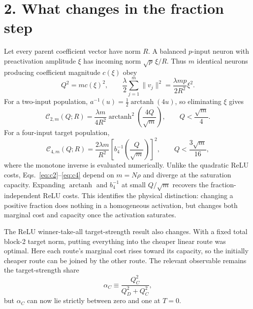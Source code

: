 \documentclass[10pt]{article}
\begin{document}
\section*{2. What changes in the fraction step}
Let every parent coefficient vector have norm $R$.  A balanced $p$-input neuron with
preactivation amplitude $\xi$ has incoming norm $\sqrt p\,\xi/R$.  Thus $m$ identical
neurons producing coefficient magnitude $c(\xi)$ obey
\begin{equation}
Q^2=m c(\xi)^2,\qquad
\frac{\lambda}{2}\sum_{j=1}^{m}\|v_j\|^2
=\frac{\lambda mp}{2R^2}\xi^2.
\label{eq:population}
\end{equation}
For a two-input population, $a^{-1}(u)=\tfrac12\operatorname{arctanh}(4u)$, so eliminating
$\xi$ gives
\begin{equation}
\boxed{\mathcal C_{2,m}(Q;R)=
\frac{\lambda m}{4R^2}\operatorname{arctanh}^2\!\left(\frac{4Q}{\sqrt m}\right)},
\qquad Q<\frac{\sqrt m}{4}.
\label{eq:c2}
\end{equation}
For a four-input target population,
\begin{equation}
\boxed{\mathcal C_{4,m}(Q;R)=
\frac{2\lambda m}{R^2}\left[b_4^{-1}\!\left(\frac{Q}{\sqrt m}\right)\right]^2},
\qquad Q<\frac{3\sqrt m}{16},
\label{eq:c4}
\end{equation}
where the monotone inverse is evaluated numerically.  Unlike the quadratic ReLU costs,
Eqs.~\eqref{eq:c2}--\eqref{eq:c4} depend on $m=N\rho$ and diverge at the saturation
capacity.  Expanding $\operatorname{arctanh}$ and $b_4^{-1}$ at small $Q/\sqrt m$ recovers
the fraction-independent ReLU costs.  This identifies the physical distinction: changing a
positive fraction does nothing in a homogeneous activation, but changes both marginal cost
and capacity once the activation saturates.

The ReLU winner-take-all target-strength result also changes.  With a fixed total block-2
target norm, putting everything into the cheaper linear route was optimal.  Here each route's
marginal cost rises toward its capacity, so the initially cheaper route can be joined by the
other route.  The relevant observable remains the target-strength share
\begin{equation}
\alpha_C\equiv\frac{Q_C^2}{Q_D^2+Q_C^2},
\label{eq:alpha}
\end{equation}
but $\alpha_C$ can now lie strictly between zero and one at $T=0$.
\end{document}
